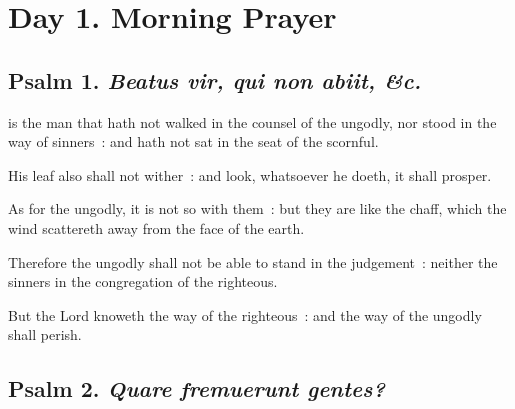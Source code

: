 \section*{Day 1. Morning Prayer}

\subsection{Psalm 1. \textit{Beatus vir, qui non abiit, \&c.}}

 is the man that hath not walked in the counsel of the ungodly, nor stood in the way of sinners~: and hath not sat in the seat of the scornful.\par
{}
His leaf also shall not wither~: and look, whatsoever he doeth, it shall prosper.\par
{}As for the ungodly, it is not so with them~: but they are like the chaff, which the wind scattereth away from the face of the earth.\par
{}Therefore the ungodly shall not be able to stand in the judgement~: neither the sinners in the congregation of the righteous.\par
{}But the Lord knoweth the way of the righteous~: and the way of the ungodly shall perish.\par

\subsection{Psalm 2. \textit{Quare fremuerunt gentes?}}

